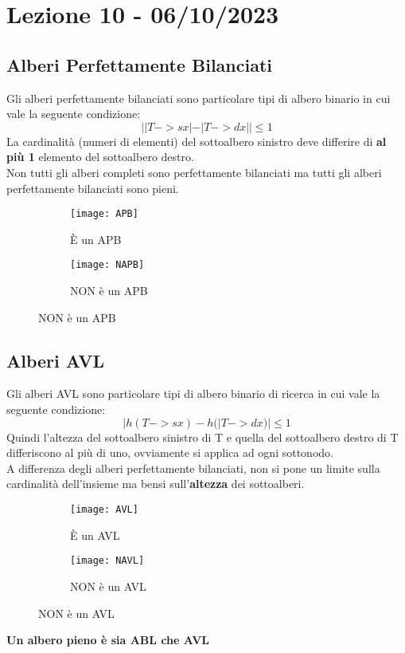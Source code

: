 \section{Lezione 10 - 06/10/2023}
\subsection{Alberi Perfettamente Bilanciati}
Gli alberi perfettamente bilanciati sono particolare tipi di albero binario in cui vale la seguente condizione:
$$ | |T->sx| - |T->dx| |  \le 1 $$ 
La cardinalità (numeri di elementi) del sottoalbero sinistro deve differire di \textbf{al più 1} elemento del sottoalbero destro.\\
Non tutti gli alberi completi sono perfettamente bilanciati ma tutti gli alberi perfettamente bilanciati sono pieni.

\begin{figure}[H]
    \centering
    \begin{subfigure}[b]{0.45\textwidth}
        \texttt{[image: APB]} 
        \caption{È un APB}
    \end{subfigure}
    \hfill
    \begin{subfigure}[b]{0.45\textwidth}
        \texttt{[image: NAPB]} 
        \caption{NON è un APB}
    \end{subfigure}
\end{figure}


\subsection{Alberi AVL}
Gli alberi AVL sono particolare tipi di albero binario di ricerca in cui vale la seguente condizione:
$$ | h(T->sx) - h(|T->dx) |  \le 1 $$ 
Quindi l'altezza del sottoalbero sinistro di T e quella del sottoalbero destro di T differiscono al più di uno, ovviamente si applica ad ogni sottonodo.\\
A differenza degli alberi perfettamente bilanciati, non si pone un limite sulla cardinalità dell'insieme ma bensi sull'\textbf{altezza} dei sottoalberi.\\

\begin{figure}[H]
    \centering
    \begin{subfigure}[b]{0.45\textwidth}
        \texttt{[image: AVL]} 
        \caption{È un AVL}
    \end{subfigure}
    \hfill
    \begin{subfigure}[b]{0.45\textwidth}
        \texttt{[image: NAVL]} 
        \caption{NON è un AVL}
    \end{subfigure}
\end{figure}
\begin{center}
    \textbf{Un albero pieno è sia ABL che AVL}    
\end{center}


